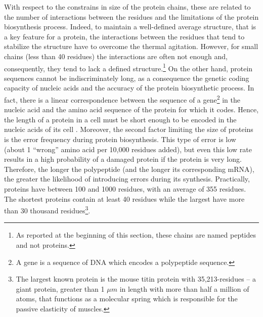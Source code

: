 With respect to the constrains in size of the protein chains, these are related to the number of interactions between the residues and the limitations of the protein biosynthesis process.
Indeed, to maintain a well-defined average structure, that is a key feature for a protein, the interactions between the residues that tend to stabilize the structure have to overcome the thermal agitation. However, for small chains (less than 40 residues) the interactions are often not enough and, consequently, they tend to lack a defined structure.\footnote{As reported at the beginning of this section, these chains are named peptides and not proteins.} %
On the other hand, protein sequences cannot be indiscriminately long, as a consequence the genetic coding capacity of nucleic acids and the accuracy of the protein biosynthetic process. In fact, there is a linear correspondence between the sequence of a gene\footnote{A gene is a sequence of DNA which encodes a polypeptide sequence.} in the nucleic acid and the amino acid sequence of the protein for which it codes. Hence, the length of a protein in a cell must be short enough to be encoded in the nucleic acids of its cell \cite{nelson2008lehninger}. Moreover, the second factor limiting the size of proteins is the error frequency during protein biosynthesis. This type of error is low (about 1 ``wrong'' amino acid per 10,000 residues added), but even this low rate results in a high probability of a damaged protein if the protein is very long. Therefore, the longer the polypeptide (and the longer its corresponding mRNA), the greater the likelihood of introducing errors during its synthesis. 
Practically, proteins have between 100 and 1000 residues, with an average of 355 residues. The shortest proteins contain at least 40 residues while the largest have more than 30 thousand residues\footnote{The largest known protein is the mouse titin protein with 35,213-residues -- a giant protein, greater than 1 $\mu m$ in length with more than half a million of atoms, that functions as a molecular spring which is responsible for the passive elasticity of muscles.}.

